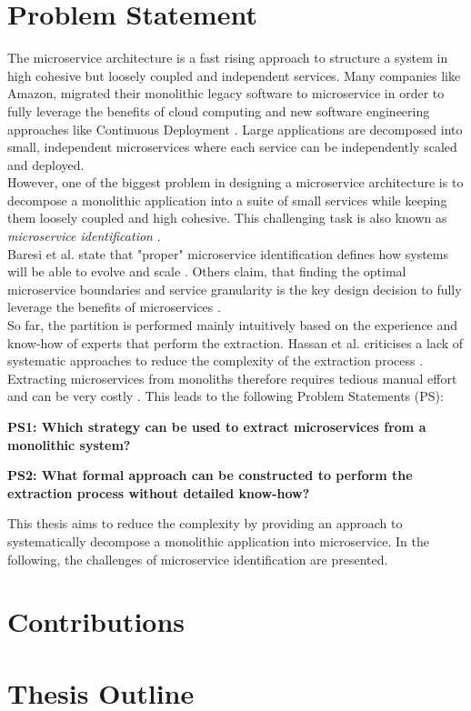 \section{Problem Statement}
\label{sec:Introduction:ProblemStatement}
The microservice architecture is a fast rising approach to structure a system in high cohesive but loosely coupled and independent services. Many companies like Amazon, migrated their monolithic legacy software to microservice in order to fully leverage the benefits of cloud computing and new software engineering approaches like Continuous Deployment \cite{MigratingCloud}. Large applications are decomposed into small, independent microservices where each service can be independently scaled and deployed. 
\\
However, one of the biggest problem in designing a microservice architecture is to decompose a monolithic application into a suite of small services while keeping them loosely coupled and high cohesive. This challenging task is also known as \textit{microservice identification} \cite{ObjectAwareAmiri}. \\
Baresi et al. state that "proper" microservice identification defines how systems will be able to evolve and scale \cite{interfaceAnalysisBaresi}. Others claim, that finding the optimal microservice boundaries and service granularity is the key design decision to fully leverage the benefits of microservices \cite{ClassificationOfRefactoring} \cite{ArchitecturalMetaModelling}. 
\\
So far, the partition is performed mainly intuitively based on the experience and know-how of experts that perform the extraction. Hassan et al. criticises a lack of systematic approaches to reduce the complexity of the extraction process \cite{ArchitecturalMetaModelling}. Extracting microservices from monoliths therefore requires tedious manual effort and can be very costly \cite{FunctionalDecompositionHeinrich} \cite{ExtractionMazlami}. This leads to the following Problem Statements (PS):

\par
\begingroup
\leftskip=1cm
\rightskip=1cm

\noindent
\textbf{PS1: Which strategy can be used to extract microservices from a monolithic  
	system? }

\noindent
\textbf{PS2: What formal approach can be constructed to perform the extraction process 
	without detailed know-how?}
\par
\endgroup

\noindent
This thesis aims to reduce the complexity by providing an approach to systematically decompose a monolithic application into microservice. In the following, the challenges of microservice identification are presented.



\section{Contributions}
\label{sec:Introduction:Contributions}


\section{Thesis Outline}
\label{sec_Introduction:ThesisOutline}











